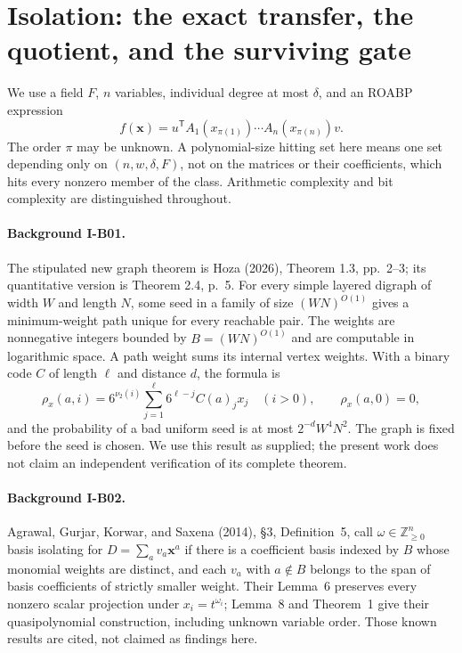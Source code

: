 
\section{Isolation: the exact transfer, the quotient, and the surviving gate}
\label{sec:isolation-track}

We use a field $F$, $n$ variables, individual degree at most $\delta$, and
an ROABP expression
\[
 f(\mathbf x)=u^{\mathsf T}A_1(x_{\pi(1)})\cdots A_n(x_{\pi(n)})v.
\]
The order $\pi$ may be unknown.  A polynomial-size hitting set here means
one set depending only on $(n,w,\delta,F)$, not on the matrices or their
coefficients, which hits every nonzero member of the class.  Arithmetic
complexity and bit complexity are distinguished throughout.

\paragraph{Background I-B01.}
The stipulated new graph theorem is Hoza (2026), Theorem 1.3, pp.~2--3;
its quantitative version is Theorem 2.4, p.~5.  For every simple layered
digraph of width $W$ and length $N$, some seed in a family of size
$(WN)^{O(1)}$ gives a minimum-weight path unique for every reachable pair.
The weights are nonnegative integers bounded by $B=(WN)^{O(1)}$ and are
computable in logarithmic space.  A path weight sums its internal vertex
weights.  With a binary code $C$ of length $\ell$ and distance $d$, the
formula is
\[
 \rho_x(a,i)=6^{\nu_2(i)}\sum_{j=1}^{\ell}6^{\ell-j}C(a)_j x_j
 \quad(i>0),\qquad \rho_x(a,0)=0,
\tag{I.1}\label{eq:I-hoza}
\]
and the probability of a bad uniform seed is at most
$2^{-d}W^4N^2$.  The graph is fixed before the seed is chosen.
We use this result as supplied; the present work does not claim an
independent verification of its complete theorem.

\paragraph{Background I-B02.}
Agrawal, Gurjar, Korwar, and Saxena (2014), \S3, Definition~5, call
$\omega\in\mathbb Z_{\geq0}^{n}$ basis isolating for
$D=\sum_a v_a\mathbf x^a$ if there is a coefficient basis indexed by $B$
whose monomial weights are distinct, and each $v_a$ with $a\notin B$
belongs to the span of basis coefficients of strictly smaller weight.
Their Lemma~6 preserves every nonzero scalar projection under
$x_i=t^{\omega_i}$; Lemma~8 and Theorem~1 give their quasipolynomial
construction, including unknown variable order.  Those known results
are cited, not claimed as findings here.

